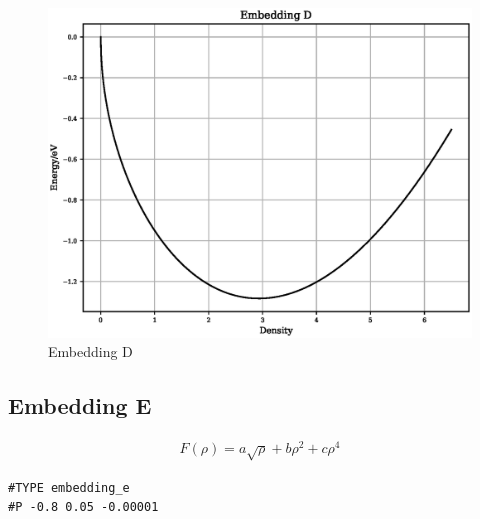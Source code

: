 \FloatBarrier
\begin{figure}[h]
  \begin{center}
    \includegraphics[scale=0.5]{appendix/functions/plots/embedding_d.eps}
    \caption{Embedding D}
    \label{graph:graph1}
  \end{center}
\end{figure}
\FloatBarrier








\subsection{Embedding E}

\begin{equation}
\begin{split}
F(\rho) = a \sqrt{\rho} + b \rho^2 + c \rho^4
\end{split}
\label{eq:embeddingE}
\end{equation}

\begin{lstlisting}[style=pseudocode,caption={Embedding E}]
#TYPE embedding_e
#P -0.8 0.05 -0.00001
\end{lstlisting}

